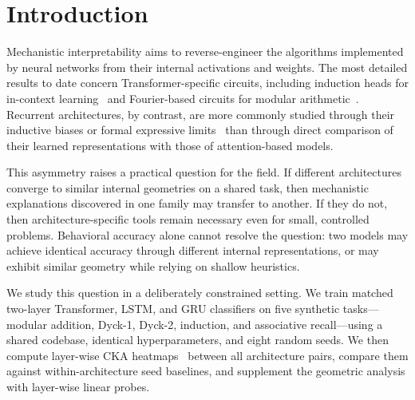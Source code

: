 \documentclass{article}
\begin{document}
\section{Introduction}
\label{sec:intro}

Mechanistic interpretability aims to reverse-engineer the 
algorithms implemented by neural networks from their internal 
activations and weights. The most detailed results to date concern 
Transformer-specific circuits, including induction heads for 
in-context learning~\citep{olsson2022induction} and Fourier-based 
circuits for modular arithmetic~\citep{nanda2023grokking}. 
Recurrent architectures, by contrast, are more commonly studied 
through their inductive biases or formal expressive 
limits~\citep{hochreiter1997lstm,cho2014gru,wen2024rnns} than 
through direct comparison of their learned representations with 
those of attention-based models.

This asymmetry raises a practical question for the field. If 
different architectures converge to similar internal geometries on 
a shared task, then mechanistic explanations discovered in one 
family may transfer to another. If they do not, then 
architecture-specific tools remain necessary even for small, 
controlled problems. Behavioral accuracy alone cannot resolve the 
question: two models may achieve identical accuracy through 
different internal representations, or may exhibit similar 
geometry while relying on shallow heuristics.

We study this question in a deliberately constrained setting. We 
train matched two-layer Transformer, LSTM, and GRU classifiers on 
five synthetic tasks---modular addition, Dyck-1, Dyck-2, 
induction, and associative recall---using a shared codebase, 
identical hyperparameters, and eight random seeds. We then compute 
layer-wise CKA heatmaps~\citep{kornblith2019similarity} between 
all architecture pairs, compare them against within-architecture 
seed baselines, and supplement the geometric analysis with 
layer-wise linear probes.
\end{document}
